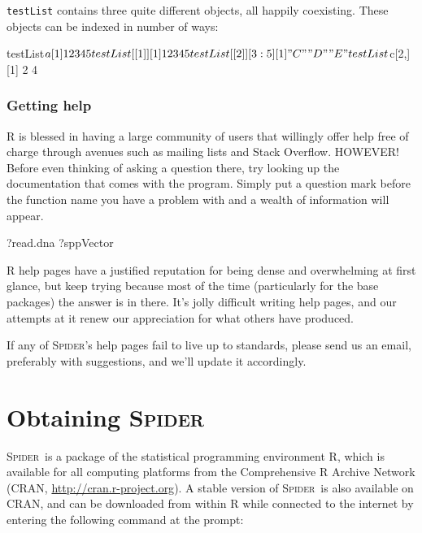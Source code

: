 \documentclass{article}
\newcommand{\spider}{\textsc{Spider}~} %
\newcommand{\Spider}{\textsc{Spider}} %
\newcommand{\progname}[1]{\textsc{#1}}
\newcommand{\fun}[1]{\texttt{#1}}
\begin{document}
\fun{testList} contains three quite different objects, all happily coexisting. These objects can be indexed in number of ways:

\begin{Rio}
testList$a
[1] 1 2 3 4 5
testList[[1]]
[1] 1 2 3 4 5
testList[[2]][3:5]
[1] "C" "D" "E"
testList$c[2,]
[1] 2 4
\end{Rio}




\subsubsection{Getting help}
\progname{R} is blessed in having a large community of users that willingly offer help free of charge through avenues such as mailing lists and Stack Overflow. HOWEVER! Before even thinking of asking a question there, try looking up the documentation that comes with the program. Simply put a question mark before the function name you have a problem with and a wealth of information will appear. 

\begin{console}
?read.dna
?sppVector
\end{console}

\progname{R} help pages have a justified reputation for being dense and overwhelming at first glance, but keep trying because most of the time (particularly for the base packages) the answer is in there. It's jolly difficult writing help pages, and our attempts at it renew our appreciation for what others have produced.

If any of \Spider's help pages fail to live up to standards, please send us an email, preferably with suggestions, and we'll update it accordingly.



\section{Obtaining \spider}
\spider is a package of the statistical programming environment \progname{R}, which is available for all computing platforms from the Comprehensive R Archive Network (CRAN, \href{http://cran.r-project.org}{http://cran.r-project.org}). A stable version of \spider is also available on CRAN, and can be downloaded from within R while connected to the internet by entering the following command at the prompt:
\end{document}
